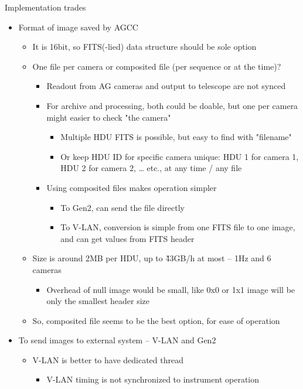 \documentclass[a4paper,notitlepage]{article}
\begin{document}
Implementation trades
\begin{itemize}
  \item Format of image saved by AGCC
  \begin{itemize}
    \item It is 16bit, so FITS(-lied) data structure should be sole option
    \item One file per camera or composited file (per sequence or at the time)?
    \begin{itemize}
      \item Readout from AG cameras and output to telescope are not synced
      \item For archive and processing, both could be doable, but one per camera might easier to check "the camera"
      \begin{itemize}
        \item Multiple HDU FITS is possible, but easy to find with "filename"
        \item Or keep HDU ID for specific camera unique: HDU 1 for camera 1, HDU 2 for camera 2, … etc., at any time / any file
      \end{itemize}
      \item Using composited files makes operation simpler
      \begin{itemize}
        \item To Gen2, can send the file directly
        \item To V-LAN, conversion is simple from one FITS file to one image, and can get values from FITS header
      \end{itemize}
    \end{itemize}
    \item Size is around 2MB per HDU, up to \~43GB/h at most -- 1Hz and 6 cameras
    \begin{itemize}
      \item Overhead of null image would be small, like 0x0 or 1x1 image will be only the smallest header size
    \end{itemize}
    \item So, composited file seems to be the best option, for ease of operation
  \end{itemize}
  \item To send images to external system -- V-LAN and Gen2
  \begin{itemize}
    \item V-LAN is better to have dedicated thread
    \begin{itemize}
      \item V-LAN timing is not synchronized to instrument operation

\end{itemize}
\end{itemize}
\end{itemize}
\end{document}
